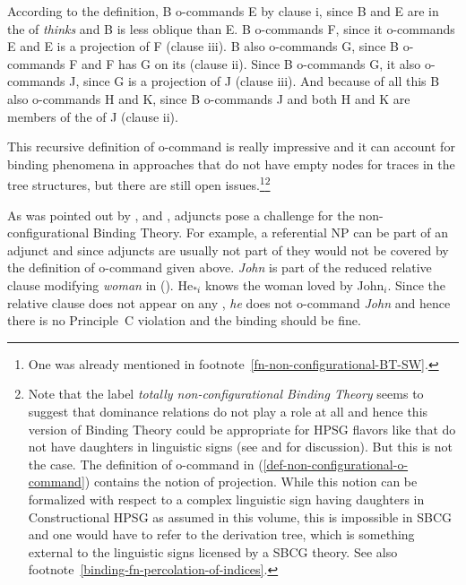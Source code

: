 \documentclass[output=paper,biblatex,babelshorthands,newtxmath,draftmode,colorlinks,citecolor=brown]{langscibook}
\begin{document}
According to the definition, B o-commands E by clause i, since B and E are in the \argstl of
\emph{thinks} and B is less oblique than E. B o-commands F, since it o-commands E and E
is a projection of F (clause iii). B also o-commands G, since B o-commands F and F has G on its
\argstl (clause ii). Since B o-commands G, it also o-commands J, since G is a projection of J
(clause iii). And because of all this B also o-commands H and K, since B o-commands J and both H and
K are members of the \argstl of J (clause ii). 

This recursive definition of o-command is really impressive and it can account for binding phenomena
in approaches that do not have empty nodes for traces in the tree structures, but there are still open
issues.\footnote{
One was already mentioned in footnote~\ref{fn-non-configurational-BT-SW}.
}\footnote{%
Note that the label \emph{totally non-configurational Binding Theory} seems to suggest that
dominance relations do not play a role at all and hence this version of Binding Theory could be appropriate for
HPSG flavors like \sbcg that do not have daughters in linguistic signs (see  and
 for discussion). But this is not the case. The definition of o-command in
(\ref{def-non-configurational-o-command}) contains the notion of projection. While this notion can
be formalized with respect to a complex linguistic sign having daughters in Constructional HPSG as
assumed in this volume, this is impossible in SBCG and one would have to refer to the derivation
tree, which is something external to the linguistic signs licensed by a SBCG theory. See also footnote~\ref{binding-fn-percolation-of-indices}.%
}

As was pointed out by \citet[]{HL96a}, \citet[Sect~20.4.1]{Mueller99a} and \citet{Walker2011a}, adjuncts pose a challenge for the
non-configurational Binding Theory. For example, a referential NP can be part of an adjunct and
since adjuncts are usually not part of \argstls they would not be covered by the definition of
o-command given above. \emph{John} is part of the reduced relative clause modifying \emph{woman} in
().
\ea
\label{ex-he-knows-the-woman-loved-by-John}
He$_{*i}$ knows the woman loved by John$_i$.
\z
Since the relative clause does not appear on any \argstl, \emph{he} does not o-command \emph{John}
and hence there is no Principle~C violation and the binding should be fine.
\end{document}
